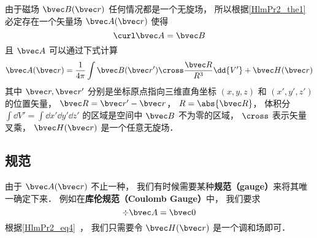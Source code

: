
\begin{issues}
\issueDraft
\end{issues}


由于磁场 $\bvec B(\bvec r)$ 任何情况都是一个无旋场， 所以根据\autoref{HlmPr2_the1}~ 必定存在一个矢量场 $\bvec A(\bvec r)$ 使得
\begin{equation}
\curl \bvec A = \bvec B
\end{equation}
且 $\bvec A$ 可以通过下式计算
\begin{equation}
\bvec A(\bvec r) = \frac{1}{4\pi} \int \bvec B(\bvec r') \cross \frac{\bvec R}{R^3} \dd{V'} + \bvec H(\bvec r)
\end{equation}
其中 $\bvec r, \bvec r'$ 分别是坐标原点指向三维直角坐标 $(x, y, z)$ 和 $(x', y', z')$ 的位置矢量， $\bvec R = \bvec r' - \bvec r$， $R = \abs{\bvec R}$， 体积分 $\int\dd{V'} = \int\dd{x'}\dd{y'}\dd{z'}$ 的区域是空间中 $\bvec B$ 不为零的区域， $\cross$ 表示矢量叉乘， $\bvec H(\bvec r)$ 是一个任意无旋场．

\subsection{规范}
由于 $\bvec A(\bvec r)$ 不止一种， 我们有时候需要某种\textbf{规范（gauge）}来将其唯一确定下来． 例如在\textbf{库伦规范（Coulomb Gauge）}中， 我们要求
\begin{equation}
\div \bvec A = \bvec 0
\end{equation}
根据\autoref{HlmPr2_eq4}~， 我们只需要令 $\bvec H(\bvec r)$ 是一个调和场即可．
